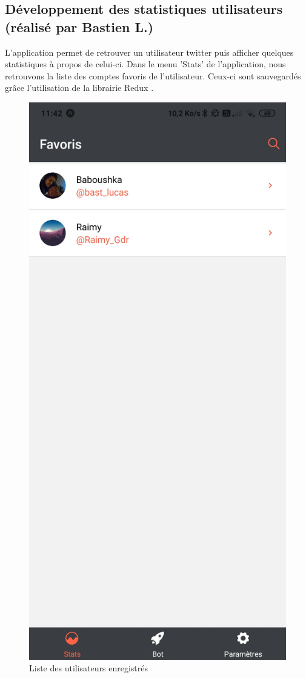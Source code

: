 \documentclass{article}
\begin{document}
\newpage

\subsection{Développement des statistiques utilisateurs (réalisé par Bastien L.)}
L'application permet de retrouver un utilisateur twitter puis afficher quelques statistiques à propos de celui-ci. Dans le menu 'Stats' de l'application, nous retrouvons la liste des comptes favoris de l'utilisateur. Ceux-ci sont sauvegardés grâce l'utilisation de la librairie Redux \citep{redux}.
\begin{figure}[h!]
\centering
\includegraphics[scale=0.1]{images/liste_user.jpg}
\caption{Liste des utilisateurs enregistrés}
\label{fig:Liste des utilisateurs enregistrés}
\end{figure}
\end{document}

